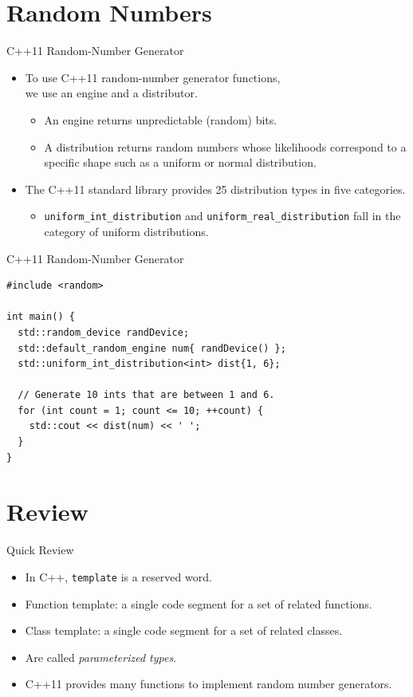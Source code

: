 \documentclass[14pt,aspectratio=1610, hyperref={pdfpagelayout=SinglePage}]{beamer}
\begin{document}
\section{Random Numbers}
\begin{frame}[fragile]{C++11 Random-Number Generator}
\begin{itemize}
\item
  To use C++11 random-number generator functions,\\
  we use an engine and a distributor.
  \begin{itemize}
  \item
    An engine returns unpredictable (random) bits.
  \item
    A distribution returns random numbers whose likelihoods correspond to
    a specific shape such as a uniform or normal distribution.
  \end{itemize}
\item
  The C++11 standard library provides 25 distribution types in five
  categories.
  \begin{itemize}
  \item
    \lstinline{uniform_int_distribution} and
    \lstinline{uniform_real_distribution} fall in the category of uniform
    distributions.
  \end{itemize}
\end{itemize}
\end{frame}

\begin{frame}[fragile]{C++11 Random-Number Generator}
\begin{lstlisting}[basicstyle=\ttfamily\small]
#include <random>

int main() {
  std::random_device randDevice;
  std::default_random_engine num{ randDevice() };
  std::uniform_int_distribution<int> dist{1, 6};

  // Generate 10 ints that are between 1 and 6.
  for (int count = 1; count <= 10; ++count) {
    std::cout << dist(num) << ' ';
  }
}
\end{lstlisting}
\end{frame}

\section{Review}

\begin{frame}[fragile]{Quick Review}
\begin{itemize}[<+->]
\item
  In C++, \lstinline{template} is a reserved word.
\item
  Function template: a single code segment for a set of related
  functions.
\item
  Class template: a single code segment for a set of related classes.
\item
  Are called \emph{parameterized types}.
\item
  C++11 provides many functions to implement random number generators.
\end{itemize}
\end{frame}
\end{document}
